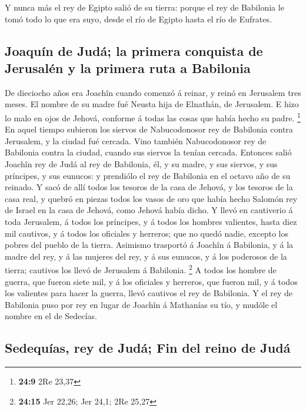  Y nunca más el rey de Egipto salió de su tierra: porque el
rey de Babilonia le tomó todo lo que era suyo, desde el río de Egipto
hasta el río de Eufrates.

\hypertarget{joaquuxedn-de-juduxe1-la-primera-conquista-de-jerusaluxe9n-y-la-primera-ruta-a-babilonia}{%
\subsection{Joaquín de Judá; la primera conquista de Jerusalén y la
primera ruta a
Babilonia}\label{joaquuxedn-de-juduxe1-la-primera-conquista-de-jerusaluxe9n-y-la-primera-ruta-a-babilonia}}

 De dieciocho años era Joachîn cuando comenzó á reinar, y
reinó en Jerusalem tres meses. El nombre de su madre fué Neusta hija de
Elnathán, de Jerusalem.  E hizo lo malo en ojos de Jehová,
conforme á todas las cosas que había hecho su padre. \footnote{\textbf{24:9}
  2Re 23,37}  En aquel tiempo subieron los siervos de
Nabucodonosor rey de Babilonia contra Jerusalem, y la ciudad fué
cercada.  Vino también Nabucodonosor rey de Babilonia
contra la ciudad, cuando sus siervos la tenían cercada. 
Entonces salió Joachîn rey de Judá al rey de Babilonia, él, y su madre,
y sus siervos, y sus príncipes, y sus eunucos: y prendiólo el rey de
Babilonia en el octavo año de su reinado.  Y sacó de allí
todos los tesoros de la casa de Jehová, y los tesoros de la casa real, y
quebró en piezas todos los vasos de oro que había hecho Salomón rey de
Israel en la casa de Jehová, como Jehová había dicho.  Y
llevó en cautiverio á toda Jerusalem, á todos los príncipes, y á todos
los hombres valientes, hasta diez mil cautivos, y á todos los oficiales
y herreros; que no quedó nadie, excepto los pobres del pueblo de la
tierra.  Asimismo trasportó á Joachîn á Babilonia, y á la
madre del rey, y á las mujeres del rey, y á sus eunucos, y á los
poderosos de la tierra; cautivos los llevó de Jerusalem á Babilonia.
\footnote{\textbf{24:15} Jer 22,26; Jer 24,1; 2Re 25,27}  A
todos los hombre de guerra, que fueron siete mil, y á los oficiales y
herreros, que fueron mil, y á todos los valientes para hacer la guerra,
llevó cautivos el rey de Babilonia.  Y el rey de Babilonia
puso por rey en lugar de Joachîn á Mathanías su tío, y mudóle el nombre
en el de Sedecías.

\hypertarget{sedequuxedas-rey-de-juduxe1-fin-del-reino-de-juduxe1}{%
\subsection{Sedequías, rey de Judá; Fin del reino de
Judá}\label{sedequuxedas-rey-de-juduxe1-fin-del-reino-de-juduxe1}}

